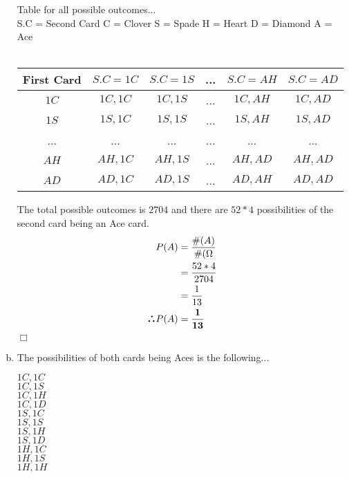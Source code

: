 \documentclass[10pt]{report}
\newenvironment{proof}{\par\noindent{\it Proof.}\hspace*{1em}}{$\Box$\bigskip}
\def\therefore{\boldsymbol{\text{ }
\leavevmode
\lower0.4ex\hbox{$\cdot$}
\kern-.5em\raise0.7ex\hbox{$\cdot$}
\kern-0.6em\lower0.4ex\hbox{$\cdot$}
\thinspace\text{ }}}
\begin{document}
\begin{enumerate}[(a)]
 \begin{proof}
 \begin{center}
 Table for all possible outcomes... \\
 \footnotesize{ S.C = Second Card }
 \footnotesize{ C = Clover }
 \footnotesize{ S = Spade}
 \footnotesize{ H = Heart}
 \footnotesize{ D = Diamond} 
 \footnotesize{ A = Ace } \\ 
 \ \\
 \begin{tabular}{ |c|c|c|c|c|c| }
 \hline
First Card &  $S.C = 1C$ & $S.C = 1S$ & ... & $S.C = AH$ & $S.C = AD$ \\
\hline
$1C$ & $1C,1C$ & $1C, 1S$ & ... & $1C, AH$ & $1C, AD$  \\
\hline
$1S$ & $1S, 1C $ & $1S,1S$ & ... & $1S, AH$ & $1S, AD $ \\
\hline
... & ... & ... & ... & ... & ... \\
\hline
$AH$ & $AH, 1C$ & $AH, 1S$ & ... & $AH, AD$ & $AH, AD $ \\
\hline
$AD$ & $AD, 1C$ & $AD, 1S$ & ... & $AD, AH$ & $AD,AD $ \\
\hline
 \end{tabular}
 \end{center}
 The total possible outcomes is $2704 $ and there are $52 * 4 $ possibilities of the second card being an Ace card. \\
     \begin{align*}
 P(A) &= \frac{\#(A)}{\#(\Omega} \\
 &= \frac{52*4}{2704} \\
 & = \frac{1}{13} \\
 \therefore  P(A) &= \mathbf{\frac{1}{13}}
 \end{align*} 
 \end{proof}
  \item The possibilities of both cards being Aces is the following...
 \begin{center}
 $1C, 1C$ \\
 $1C, 1S $ \\
 $1C, 1H $ \\
 $1C, 1D $ \\
 $1S, 1C $ \\
 $1S, 1S $ \\
 $1S, 1H $ \\
 $1S, 1D $ \\
 $1H, 1C $ \\
 $1H, 1S $ \\
 $1H, 1H $ \\

\end{center}
\end{enumerate}
\end{document}
